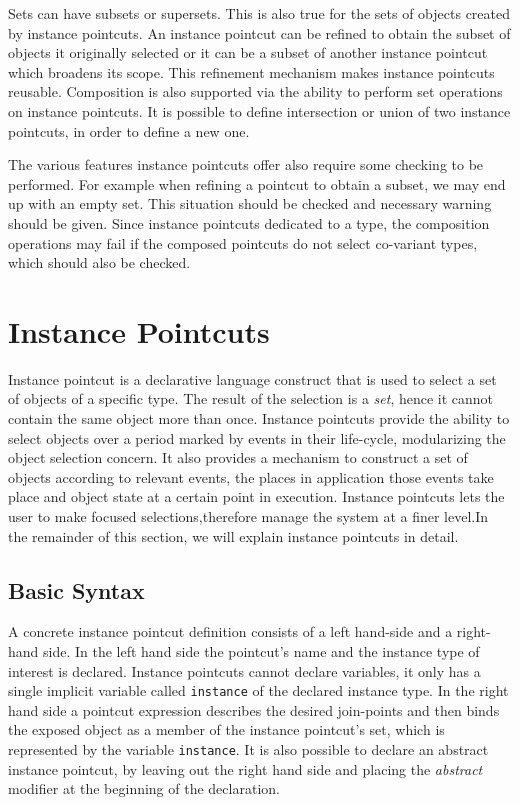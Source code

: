 \documentclass{llncs}
\begin{document}
Sets can have subsets or supersets. This is also true for the sets of objects created by instance pointcuts. An instance pointcut can be refined to obtain the subset of objects it originally selected or it can be a subset of another instance pointcut which broadens its scope. This refinement mechanism makes instance pointcuts reusable. Composition is also supported via the ability to perform set operations on instance pointcuts. It is possible to define intersection or union of two instance pointcuts, in order to define a new one. 

The various features instance pointcuts offer also require some checking to be performed. For example when refining a pointcut to obtain a subset, we may end up with an empty set. This situation should be checked and necessary warning should be given. Since instance pointcuts dedicated to a type, the composition operations may fail if the composed pointcuts do not select co-variant types, which should also be checked.






\hline
\hline

\section{Instance Pointcuts}

Instance pointcut is a declarative language construct that is used to select a set of objects of a specific type. The result of the selection is a \emph{set}, hence it cannot contain the same object more than once. Instance pointcuts provide the ability to select objects over a period marked by events in their life-cycle, modularizing the object selection concern. It also provides a mechanism to construct a set of objects according to relevant events, the places in application those events take place and object state at a certain point in execution. Instance pointcuts lets the user to make focused selections,therefore manage the system at a finer level.In the remainder of this section, we will explain instance pointcuts in detail. 


\subsection{Basic Syntax}

A concrete instance pointcut definition consists of a left hand-side and a right-hand side. In the left hand side the pointcut's name and the instance type of interest is declared. Instance pointcuts cannot declare variables, it only has a single implicit variable called \texttt{instance} of the declared instance type. In the right hand side a pointcut expression describes the desired join-points and then binds the exposed object as a member of the instance pointcut's set, which is represented by the variable \texttt{instance}.  It is also possible to declare an abstract instance pointcut, by leaving out the right hand side and placing the \emph{abstract} modifier at the beginning of the declaration.
\end{document}
